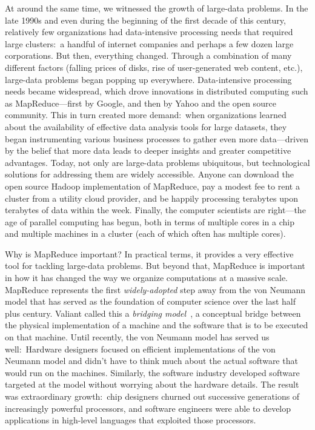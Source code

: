 At around the same time, we witnessed the growth of large-data
problems.  In the late 1990s and even during the beginning of the
first decade of this century, relatively few organizations had
data-intensive processing needs that required large clusters:\ a
handful of internet companies and perhaps a few dozen large
corporations.  But then, everything changed.  Through a combination of
many different factors (falling prices of disks, rise of
user-generated web content, etc.), large-data problems began popping
up everywhere.  Data-intensive processing needs became widespread,
which drove innovations in distributed computing such as
MapReduce---first by Google, and then by Yahoo and the open source
community.  This in turn created more demand:\ when organizations
learned about the availability of effective data analysis tools for
large datasets, they began instrumenting various business processes to
gather even more data---driven by the belief that more data leads to
deeper insights and greater competitive advantages.  Today, not only
are large-data problems ubiquitous, but technological solutions for
addressing them are widely accessible.  Anyone can download the open
source Hadoop implementation of MapReduce, pay a modest fee to rent a
cluster from a utility cloud provider, and be happily processing
terabytes upon terabytes of data within the week.  Finally, the
computer scientists are right---the age of parallel computing has
begun, both in terms of multiple cores in a chip and multiple machines
in a cluster (each of which often has multiple cores).

Why is MapReduce important?  In practical terms, it provides a very
effective tool for tackling large-data problems.  But beyond that,
MapReduce is important in how it has changed the way we organize
computations at a massive scale.  MapReduce represents the first {\it
  widely-adopted} step away from the von Neumann model that has served
as the foundation of computer science over the last half plus century.
Valiant called this a {\it bridging model}~\cite{Valiant_CACM1990}, a
conceptual bridge between the physical implementation of a machine and
the software that is to be executed on that machine.  Until recently,
the von Neumann model has served us well:\ Hardware designers focused
on efficient implementations of the von Neumann model and didn't have
to think much about the actual software that would run on the
machines.  Similarly, the software industry developed software
targeted at the model without worrying about the hardware details.
The result was extraordinary growth:\ chip designers churned out
successive generations of increasingly powerful processors, and
software engineers were able to develop applications in high-level
languages that exploited those processors.

